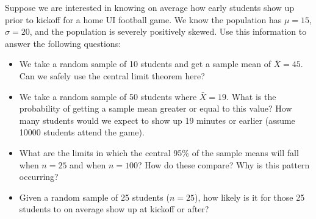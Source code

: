 \documentclass[11pt]{article}
\begin{document}
Suppose we are interested in knowing on average how early students show up prior to kickoff for a home UI football game. We know the population has $\mu = 15$, $\sigma = 20$, and the population is severely positively skewed. Use this information to answer the following questions:
\begin{itemize}
\item We take a random sample of 10 students and get a sample mean of $\bar{X} = 45$. Can we safely use the central limit theorem here? 
\item We take a random sample of 50 students where $\bar{X} = 19$. What is the probability of getting a sample mean greater or equal to this value? How many students would we expect to show up 19 minutes or earlier (assume 10000 students attend the game).
\item What are the limits in which the central 95\% of the sample means will fall when $n = 25$ and when $n = 100$? How do these compare? Why is this pattern occurring?
\item Given a random sample of 25 students ($n = 25$), how likely is it for those 25 students to on average show up at kickoff or after?
\end{itemize}
\end{document}
